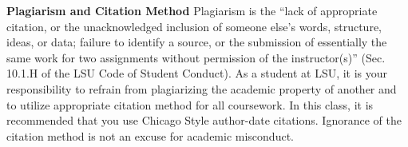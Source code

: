 \documentclass[11pt,article,oneside]{memoir}
\begin{document}
\noindent \textbf{Plagiarism and Citation Method}
Plagiarism is the ``lack of appropriate citation, or the unacknowledged inclusion of someone else's words, structure, ideas, or data; failure to identify a source, or the submission of essentially the same work for two assignments without permission of the instructor(s)'' (Sec. 10.1.H of the LSU Code of Student Conduct). As a student at LSU, it is your responsibility to refrain from plagiarizing the academic property of another and to utilize appropriate citation method for all coursework. In this class, it is recommended that you use Chicago Style author-date citations. Ignorance of the citation method is not an excuse for academic misconduct. 

\end{document}
